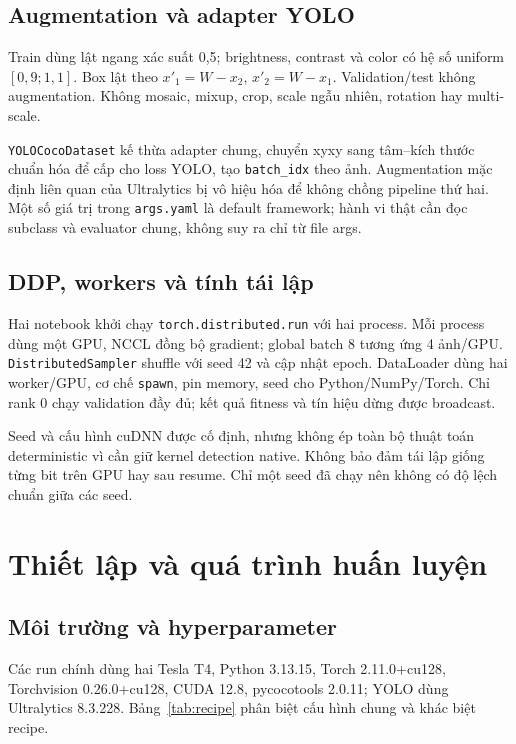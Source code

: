 \documentclass[a4paper,10pt,twocolumn]{article}
\begin{document}
\subsection{Augmentation và adapter YOLO}
Train dùng lật ngang xác suất 0,5; brightness, contrast và color có hệ số uniform
$[0,9;1,1]$. Box lật theo $x'_1=W-x_2$, $x'_2=W-x_1$. Validation/test không
augmentation. Không mosaic, mixup, crop, scale ngẫu nhiên, rotation hay multi-scale.

\texttt{YOLOCocoDataset} kế thừa adapter chung, chuyển xyxy sang tâm--kích thước
chuẩn hóa để cấp cho loss YOLO, tạo \texttt{batch\_idx} theo ảnh. Augmentation mặc
định liên quan của Ultralytics bị vô hiệu hóa để không chồng pipeline thứ hai.
Một số giá trị trong \texttt{args.yaml} là default framework; hành vi thật cần đọc
subclass và evaluator chung, không suy ra chỉ từ file args.

\subsection{DDP, workers và tính tái lập}
Hai notebook khởi chạy \texttt{torch.distributed.run} với hai process.
Mỗi process dùng một GPU, NCCL đồng bộ gradient; global batch 8 tương ứng 4 ảnh/GPU.
\texttt{DistributedSampler} shuffle với seed 42 và cập nhật epoch. DataLoader dùng
hai worker/GPU, cơ chế \texttt{spawn}, pin memory, seed cho Python/NumPy/Torch.
Chỉ rank 0 chạy validation đầy đủ; kết quả fitness và tín hiệu dừng được broadcast.

Seed và cấu hình cuDNN được cố định, nhưng không ép toàn bộ thuật toán deterministic
vì cần giữ kernel detection native. Không bảo đảm tái lập giống từng bit trên GPU
hay sau resume. Chỉ một seed đã chạy nên không có độ lệch chuẩn giữa các seed.

\section{Thiết lập và quá trình huấn luyện}
\subsection{Môi trường và hyperparameter}
Các run chính dùng hai Tesla T4, Python 3.13.15, Torch 2.11.0+cu128,
Torchvision 0.26.0+cu128, CUDA 12.8, pycocotools 2.0.11;
YOLO dùng Ultralytics 8.3.228.
Bảng~\ref{tab:recipe} phân biệt cấu hình chung và khác biệt recipe.
\end{document}
